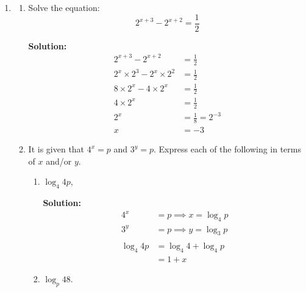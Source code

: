 \documentclass{report}
\newcommand{\sol}{\textbf{Solution:}}
\begin{document}
\begin{enumerate}[leftmargin=*]
    \item \begin{enumerate}
              \item Solve the equation: $$ 2^{x+3}-2^{x+2}=\frac{1}{2} $$

                    \sol{}
                    \begin{align*}
                        2^{x+3}-2^{x+2}                 & = \frac{1}{2}          \\
                        2^x \times 2^3 - 2^x \times 2^2 & = \frac{1}{2}          \\
                        8 \times 2^x - 4 \times 2^x     & = \frac{1}{2}          \\
                        4 \times 2^x                    & = \frac{1}{2}          \\
                        2^x                             & = \frac{1}{8} = 2^{-3} \\
                        x                               & = -3
                    \end{align*}

                    \newpage
              \item It is given that $4^x=p$ and $3^y=p$. Express each of the following in terms of
                    $x$ and/or $y$.
                    \begin{enumerate}
                        \item $\log _4 4 p$,

                              \sol{}
                              \begin{align*}
                                  4^x         & = p \implies x = \log_4 p \\
                                  3^y         & = p \implies y = \log_3 p \\
                                  \\
                                  \log _4 4 p & = \log _4 4 + \log _4 p   \\
                                              & = 1 + x
                              \end{align*}

                        \item $\log _p 48$.


\end{enumerate}
\end{enumerate}
\end{enumerate}
\end{document}
